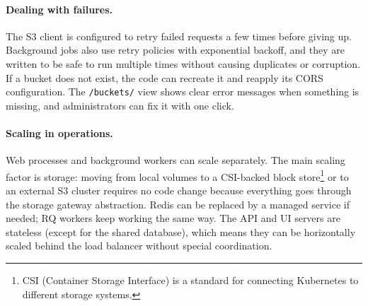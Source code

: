 \paragraph{Dealing with failures.}
The S3 client is configured to retry failed requests a few times before giving up.  
Background jobs also use retry policies with exponential backoff, and they are written to be safe to run multiple times without causing duplicates or corruption.  
If a bucket does not exist, the code can recreate it and reapply its CORS configuration.  
The \texttt{/buckets/} view shows clear error messages when something is missing, and administrators can fix it with one click.

\paragraph{Scaling in operations.}
Web processes and background workers can scale separately.  
The main scaling factor is storage: moving from local volumes to a CSI-backed block store\footnote{CSI (Container Storage Interface) is a standard for connecting Kubernetes to different storage systems.} or to an external S3 cluster requires no code change because everything goes through the storage gateway abstraction.  
Redis can be replaced by a managed service if needed; RQ workers keep working the same way.  
The API and UI servers are stateless (except for the shared database), which means they can be horizontally scaled behind the load balancer without special coordination.